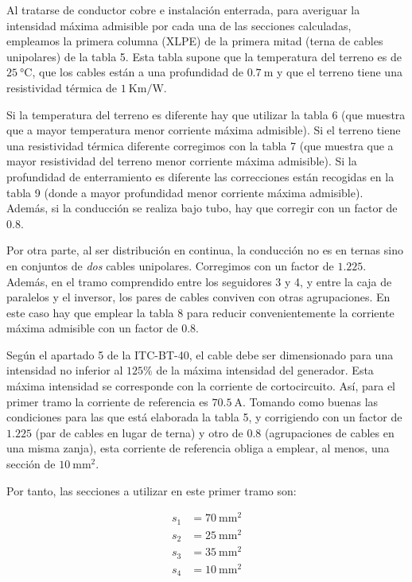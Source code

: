 Al tratarse de conductor cobre e instalación enterrada, para averiguar
la intensidad máxima admisible por cada una de las secciones
calculadas, empleamos la primera columna (XLPE) de la primera
mitad (terna de cables unipolares) de la tabla 5. Esta tabla supone
que la temperatura del terreno es de $\SI{25}{\celsius}$, que los
cables están a una profundidad de $\SI{0.7}{\meter}$ y que el terreno
tiene una resistividad térmica de $\SI{1}{\kelvin\meter\per\watt}$.

Si la temperatura del terreno es diferente hay que utilizar la tabla 6
(que muestra que a mayor temperatura menor corriente máxima
admisible). Si el terreno tiene una resistividad térmica diferente
corregimos con la tabla 7 (que muestra que a mayor resistividad del
terreno menor corriente máxima admisible). Si la profundidad de
enterramiento es diferente las correcciones están recogidas en la
tabla 9 (donde a mayor profundidad menor corriente máxima
admisible). Además, si la conducción se realiza bajo tubo, hay que
corregir con un factor de $0.8$.

Por otra parte, al ser distribución en continua, la conducción no es
en ternas sino en conjuntos de \emph{dos} cables
unipolares. Corregimos con un factor de $1.225$. Además, en el tramo
comprendido entre los seguidores 3 y 4, y entre la caja de paralelos y
el inversor, los pares de cables conviven con otras agrupaciones. En
este caso hay que emplear la tabla 8 para reducir convenientemente la
corriente máxima admisible con un factor de 0.8.

Según el apartado 5 de la ITC-BT-40, el cable debe ser dimensionado
para una intensidad no inferior al $125\%$ de la máxima intensidad del
generador. Esta máxima intensidad se corresponde con la corriente de
cortocircuito. Así, para el primer tramo la corriente de referencia es
$\SI{70.5}{\ampere}$.  Tomando como buenas las
condiciones para las que está elaborada la tabla 5, y corrigiendo con
un factor de $1.225$ (par de cables en lugar de terna) y otro de $0.8$
(agrupaciones de cables en una misma zanja), esta corriente de
referencia obliga a emplear, al menos, una sección de
$\SI{10}{\milli\meter\squared}$. 

Por tanto, las secciones a utilizar en este primer tramo son:

\begin{align*}
  s_1 & = \SI{70}{\milli\meter\squared}\\
  s_2 & = \SI{25}{\milli\meter\squared}\\
  s_3 & = \SI{35}{\milli\meter\squared}\\
  s_4 & = \SI{10}{\milli\meter\squared}\\
\end{align*}

